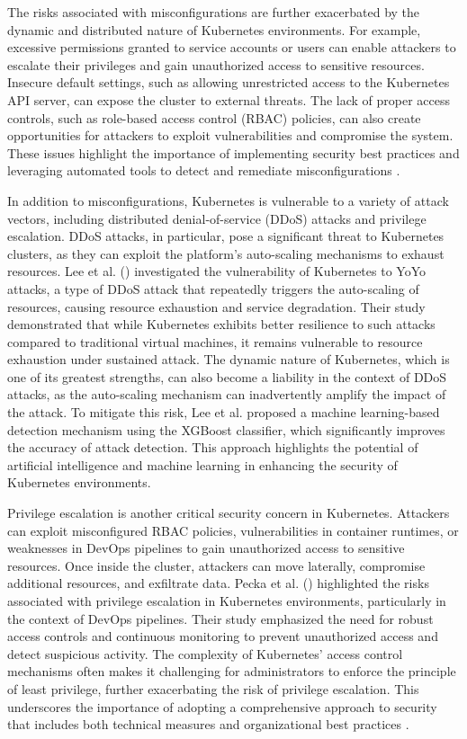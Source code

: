 The risks associated with misconfigurations are further exacerbated by the dynamic and distributed nature of Kubernetes environments. For example, excessive permissions granted to service accounts or users can enable attackers to escalate their privileges and gain unauthorized access to sensitive resources. Insecure default settings, such as allowing unrestricted access to the Kubernetes API server, can expose the cluster to external threats. The lack of proper access controls, such as role-based access control (RBAC) policies, can also create opportunities for attackers to exploit vulnerabilities and compromise the system. These issues highlight the importance of implementing security best practices and leveraging automated tools to detect and remediate misconfigurations \citep{rahman2023, bose2021}.

In addition to misconfigurations, Kubernetes is vulnerable to a variety of attack vectors, including distributed denial-of-service (DDoS) attacks and privilege escalation. DDoS attacks, in particular, pose a significant threat to Kubernetes clusters, as they can exploit the platform's auto-scaling mechanisms to exhaust resources. Lee et al. (\citeyear{lee2023}) investigated the vulnerability of Kubernetes to YoYo attacks, a type of DDoS attack that repeatedly triggers the auto-scaling of resources, causing resource exhaustion and service degradation. Their study demonstrated that while Kubernetes exhibits better resilience to such attacks compared to traditional virtual machines, it remains vulnerable to resource exhaustion under sustained attack. The dynamic nature of Kubernetes, which is one of its greatest strengths, can also become a liability in the context of DDoS attacks, as the auto-scaling mechanism can inadvertently amplify the impact of the attack. To mitigate this risk, Lee et al. proposed a machine learning-based detection mechanism using the XGBoost classifier, which significantly improves the accuracy of attack detection. This approach highlights the potential of artificial intelligence and machine learning in enhancing the security of Kubernetes environments.

Privilege escalation is another critical security concern in Kubernetes. Attackers can exploit misconfigured RBAC policies, vulnerabilities in container runtimes, or weaknesses in DevOps pipelines to gain unauthorized access to sensitive resources. Once inside the cluster, attackers can move laterally, compromise additional resources, and exfiltrate data. Pecka et al. (\citeyear{pecka2022}) highlighted the risks associated with privilege escalation in Kubernetes environments, particularly in the context of DevOps pipelines. Their study emphasized the need for robust access controls and continuous monitoring to prevent unauthorized access and detect suspicious activity. The complexity of Kubernetes' access control mechanisms often makes it challenging for administrators to enforce the principle of least privilege, further exacerbating the risk of privilege escalation. This underscores the importance of adopting a comprehensive approach to security that includes both technical measures and organizational best practices \citep{pecka2022}.

